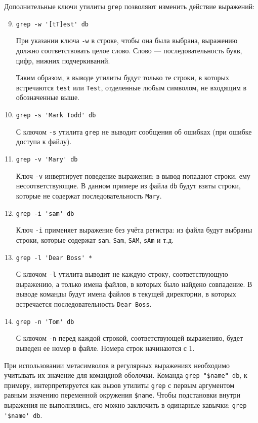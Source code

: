 \documentclass[listings]{labreport}
\begin{document}
\newpage
Дополнительные ключи утилиты \verb|grep| позволяют изменить действие выражений:

\begin{enumerate}
\setcounter{enumi}{8}

\item \verb|grep -w '[tT]est' db|

При указании ключа \texttt{-w} в строке, чтобы она была выбрана, выражению должно соответствовать целое слово.
Слово — последовательность букв, цифр, нижних подчеркиваний.

Таким образом, в выводе утилиты будут только те строки, в которых встречаются \texttt{test} или \texttt{Test}, отделенные
любым символом, не входящим в обозначенные выше.

\item \verb|grep -s 'Mark Todd' db|

С ключом \verb|-s| утилита \texttt{grep} не выводит сообщения об ошибках (при ошибке доступа к файлу). 

\item \verb|grep -v 'Mary' db|

Ключ \verb|-v| инвертирует поведение выражения: в вывод попадают строки, ему несоответствующие.
В данном примере из файла \texttt{db} будут взяты строки, которые не содержат последовательность \texttt{Mary}.

\item \verb|grep -i 'sam' db|

Ключ \verb|-i| применяет выражение без учёта регистра: из файла будут выбраны строки, которые содержат
\texttt{sam}, \texttt{Sam}, \texttt{SAM}, \texttt{sAm} и т.д.

\item \verb|grep -l 'Dear Boss' *|

С ключом \verb|-l| утилита выводит не каждую строку, соответствующую выражению, а только имена файлов,
в которых было найдено совпадение. В выводе команды будут имена файлов в текущей директории,
в которых встречается последовательность \texttt{Dear Boss}.

\item \verb|grep -n 'Tom' db|

С ключом \verb|-n| перед каждой строкой, соответствующей выражению, будет выведен ее номер в файле.
Номера строк начинаются с 1.

\end{enumerate}

При использовании метасимволов в регулярных выражениях необходимо учитывать их значение для командной оболочки.
Команда \verb|grep "$name" db|, к примеру, интерпретируется как вызов утилиты \texttt{grep} с первым аргументом
равным значению переменной окружения \verb|$name|. Чтобы подстановки внутри выражения не выполнялись, его можно
заключить в одинарные кавычки: \verb|grep '$name' db|.
\end{document}
